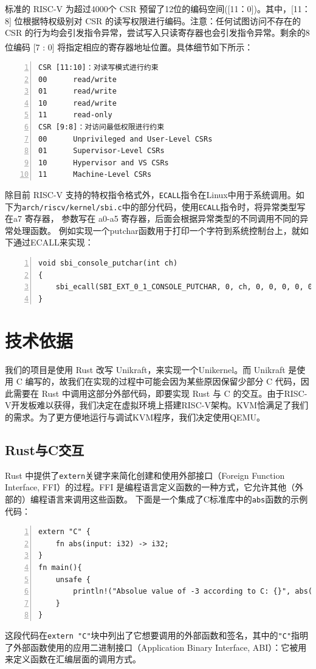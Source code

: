 \documentclass[UTF8,fontset=none,linespread=1.15]{ctexart}
\let\nosupcite\cite
\renewcommand*{\cite}[1]{\textsuperscript{\nosupcite{#1}}}
\begin{document}
标准的 RISC-V 为超过4000个 CSR 预留了12位的编码空间([11：0])。其中，[11：8] 位根据特权级别对 CSR 的读写权限进行编码。注意：任何试图访问不存在的 CSR 的行为均会引发指令异常，尝试写入只读寄存器也会引发指令异常。剩余的8位编码 [7 :  0] 将指定相应的寄存器地址位置。具体细节如下所示：\cite{b}\cite{c}

\begin{lstlisting}[numbers=left]
CSR [11:10]：对读写模式进行约束
00		read/write
01		read/write
10		read/write
11		read-only
CSR [9:8]：对访问最低权限进行约束
00		Unprivileged and User-Level CSRs
01		Supervisor-Level CSRs
10		Hypervisor and VS CSRs
11		Machine-Level CSRs
\end{lstlisting}
除目前 RISC-V 支持的特权指令格式外，\texttt{ECALL}指令在Linux中用于系统调用。如下为\texttt{arch/riscv/kernel/sbi.c}中的部分代码，使用\texttt{ECALL}指令时，将异常类型写在a7 寄存器， 参数写在 a0-a5 寄存器，后面会根据异常类型的不同调用不同的异常处理函数。
​		例如实现一个putchar函数用于打印一个字符到系统控制台上，就如下通过ECALL来实现：
\begin{lstlisting}[numbers=left]
void sbi_console_putchar(int ch)
{
	sbi_ecall(SBI_EXT_0_1_CONSOLE_PUTCHAR, 0, ch, 0, 0, 0, 0, 0);
}
\end{lstlisting}
\section{技术依据}
我们的项目是使用 Rust 改写 Unikraft，来实现一个Unikernel。而 Unikraft 是使用 C 编写的，故我们在实现的过程中可能会因为某些原因保留少部分 C 代码，因此需要在 Rust 中调用这部分外部代码，即要实现 Rust 与 C 的交互。由于RISC-V开发板难以获得，我们决定在虚拟环境上搭建RISC-V架构。KVM恰满足了我们的需求。为了更方便地运行与调试KVM程序，我们决定使用QEMU。
\subsection{Rust与C交互}
Rust 中提供了\texttt{extern}关键字来简化创建和使用外部接口（Foreign Function Interface, FFI）的过程。FFI 是编程语言定义函数的一种方式，它允许其他（外部的）编程语言来调用这些函数。
下面是一个集成了C标准库中的\texttt{abs}函数的示例代码：
\begin{lstlisting}[numbers=left]
extern "C" {
	fn abs(input: i32) -> i32;
}
fn main(){
	unsafe {
		println!("Absolue value of -3 according to C: {}", abs(-3));
	}
}
\end{lstlisting}
这段代码在\texttt{extern "C"}块中列出了它想要调用的外部函数和签名，其中的\texttt{"C"}指明了外部函数使用的应用二进制接口（Application Binary Interface, ABI）：它被用来定义函数在汇编层面的调用方式。
\end{document}
